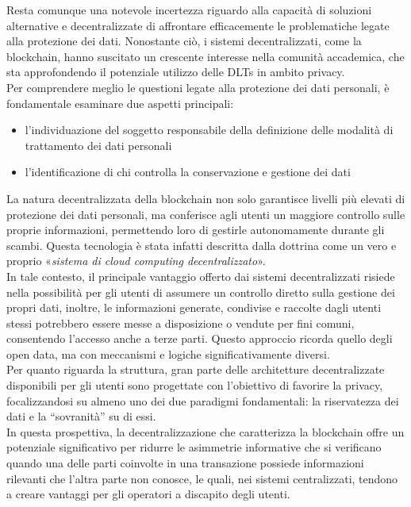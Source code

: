 Resta comunque una notevole incertezza riguardo alla capacità di soluzioni alternative e decentralizzate di affrontare efficacemente le problematiche legate alla protezione dei dati.
Nonostante ciò, i sistemi decentralizzati, come la blockchain, hanno suscitato un crescente interesse nella comunità accademica, che sta approfondendo il potenziale utilizzo delle DLTs in ambito privacy.
\\Per comprendere meglio le questioni legate alla protezione dei dati personali, è fondamentale esaminare due aspetti principali:
\begin{itemize}
    \item l'individuazione del soggetto responsabile della definizione delle modalità di trattamento dei dati personali
    \item l'identificazione di chi controlla la conservazione e gestione dei dati
\end{itemize}
La natura decentralizzata della blockchain non solo garantisce livelli più elevati di protezione dei dati personali, ma conferisce agli utenti un maggiore controllo sulle proprie informazioni, permettendo loro di gestirle autonomamente durante gli scambi. Questa tecnologia è stata infatti descritta dalla dottrina come un vero e proprio «\textit{sistema di cloud computing decentralizzato}».
\\In tale contesto, il principale vantaggio offerto dai sistemi decentralizzati risiede nella possibilità per gli utenti di assumere un controllo diretto sulla gestione dei propri dati, inoltre, le informazioni generate, condivise e raccolte dagli utenti stessi potrebbero essere messe a disposizione o vendute per fini comuni,
consentendo l'accesso anche a terze parti. Questo approccio ricorda quello degli open data, ma con meccanismi e logiche significativamente diversi.
\\Per quanto riguarda la struttura, gran parte delle architetture decentralizzate disponibili per gli utenti sono progettate con l'obiettivo di favorire la privacy, focalizzandosi su almeno uno dei due paradigmi fondamentali: la riservatezza dei dati e la “sovranità” su di essi.
\\In questa prospettiva, la decentralizzazione che caratterizza la blockchain offre un potenziale significativo per ridurre le asimmetrie informative che si verificano quando una delle parti coinvolte in una transazione possiede informazioni rilevanti che l'altra parte non conosce, le quali, nei sistemi centralizzati, tendono a creare vantaggi per gli operatori a discapito degli utenti.

